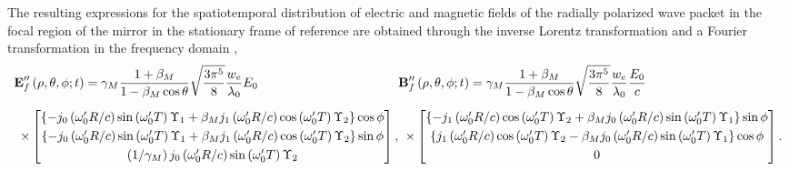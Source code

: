 \documentclass[10pt, a4paper, twoside, openright]{report}
\renewcommand{\vec}[1]{\boldsymbol{\mathrm{#1}}}
\begin{document}
The resulting expressions for the spatiotemporal distribution of electric and magnetic fields of the radially polarized wave packet in the focal region of the mirror in the stationary frame of reference are obtained through the inverse Lorentz transformation and a Fourier transformation in the frequency domain \cite{Jeong2021},
\begin{subequations}
\begin{equation}\label{eq:reflected_e_lab_frame_parabolic}
\begin{aligned}
\vec{E}^{\prime \prime}_{f} & \left(\rho, \theta, \phi; t \right) = \gamma_M \frac{1 + \beta_M}{1 - \beta_M \cos \theta} \sqrt{\frac{3 \pi^5}{8}} \frac{w_e}{\lambda_0} E_0 \\[2mm]
\times &
\begin{bmatrix}
	\left\lbrace -j_0 \left( \omega_0^{\prime} R / c \right) \sin \left(\omega_0^{\prime} T \right) \Upsilon_1 + \beta_M j_1 \left( \omega_0^{\prime} R / c \right) \cos \left(\omega_0^{\prime} T \right) \Upsilon_2 \right\rbrace \cos \phi \\[1mm]
	\left\lbrace -j_0 \left( \omega_0^{\prime} R / c \right) \sin \left(\omega_0^{\prime} T \right) \Upsilon_1 + \beta_M j_1 \left( \omega_0^{\prime} R / c \right) \cos \left(\omega_0^{\prime} T \right) \Upsilon_2 \right\rbrace \sin \phi \\[1mm]
	\left( 1 / \gamma_M \right) j_0 \left( \omega_0^{\prime} R / c \right) \sin \left(\omega_0^{\prime} T \right) \Upsilon_2
\end{bmatrix},
\end{aligned}
\end{equation}\vspace{2mm}
\begin{equation}\label{eq:reflected_b_lab_frame_parabolic}
\begin{aligned}
\vec{B}^{\prime \prime}_{f} & \left(\rho, \theta, \phi; t \right) = \gamma_M \frac{1 + \beta_M}{1 - \beta_M \cos \theta} \sqrt{\frac{3 \pi^5}{8}} \frac{w_e}{\lambda_0} \frac{E_0}{c} \\[2mm]
\times & 
\begin{bmatrix}
	\left\lbrace -j_1 \left( \omega_0^{\prime} R / c \right) \cos \left(\omega_0^{\prime} T \right) \Upsilon_2 + \beta_M j_0 \left( \omega_0^{\prime} R / c \right) \sin \left(\omega_0^{\prime} T \right) \Upsilon_1 \right\rbrace \sin \phi \\[1mm]
	\left\lbrace j_1 \left( \omega_0^{\prime} R / c \right) \cos \left(\omega_0^{\prime} T \right) \Upsilon_2 - \beta_M j_0 \left( \omega_0^{\prime} R / c \right) \sin \left(\omega_0^{\prime} T \right) \Upsilon_1 \right\rbrace \cos \phi \\[1mm]
	0
\end{bmatrix}.
\end{aligned}
\end{equation}
\end{subequations}
\end{document}
